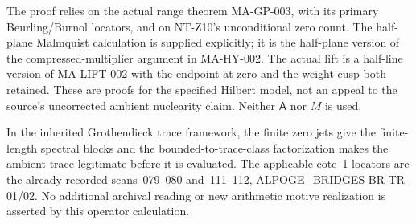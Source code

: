 The proof relies on the actual range theorem MA-GP-003,
with its primary Beurling/Burnol locators, and on NT-Z10's
unconditional zero count.  The half-plane Malmquist calculation
is supplied explicitly; it is the half-plane version of the
compressed-multiplier argument in MA-HY-002.
The actual lift is a half-line version of MA-LIFT-002 with
the endpoint at zero and the weight cusp both retained.
These are proofs for the specified Hilbert model, not an
appeal to the source's uncorrected ambient nuclearity claim.
Neither $\mathsf A$ nor $M$ is used.

In the inherited Grothendieck trace framework, the finite
zero jets give the finite-length spectral blocks and the
bounded-to-trace-class factorization makes the ambient
trace legitimate before it is evaluated.  The applicable
cote~1 locators are the already recorded scans~079--080
and~111--112, ALPOGE\_BRIDGES BR-TR-01/02.
No additional archival reading or new arithmetic motive
realization is asserted by this operator calculation.
